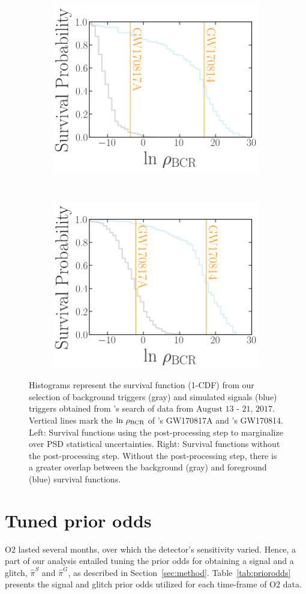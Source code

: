 \documentclass[useAMS,fleqn, usenatbib, final]{mnras}
\newcommand{\pycbc}{{\sc {{PyCBC}}}\xspace}
\newcommand{\GWTC}{{\sc {{GWTC-1}}}\xspace}
\newcommand{\IAS}{{\sc {{IAS}}}\xspace}
\newcommand{\mathcmd}[1]{{\sc \relax\ifmmode#1\else $#1$\fi}\xspace}
\newcommand{\bcr}{\mathcmd{\rho_\text{BCR}}}
\begin{document}
\begin{figure}
    \centering
    \begin{subfigure}
        \centering
        \includegraphics[width=0.45\linewidth]{reweighted_bcr_cdf_smaller_legend.png}
    \end{subfigure}
    ~ 
    \begin{subfigure}
        \centering
        \includegraphics[width=0.45\linewidth]{orig_bcr_cdf_smaller_legend.png}
    \end{subfigure}
    \caption{
    Histograms represent the survival function (1-CDF) from our selection of background triggers (gray) and simulated signals (blue) triggers obtained from \pycbc's search of data from $\text{August 13 - 21, 2017}$. Vertical lines mark the $\text{ln}\ \bcr$ of \IAS's GW170817A and \GWTC's GW170814.
    Left: Survival functions using the post-processing step to marginalize over PSD statistical uncertainties. Right: Survival functions without the post-processing step. Without the post-processing step, there is a greater overlap between the background (gray) and foreground (blue) survival functions.
    \label{fig:bcrCdf}}
\end{figure}



\section{Tuned prior odds}\label{apdx:alphabeta}

O2 lasted several months, over which the detector's sensitivity varied. Hence, a part of our analysis entailed tuning the prior odds for obtaining a signal and a glitch, $\hat{\pi}^S$ and $\hat{\pi}^G$, as described in Section~\ref{sec:method}. Table~\ref{tab:priorodds} presents the signal and glitch prior odds utilized for each time-frame of O2 data. 

\end{document}

